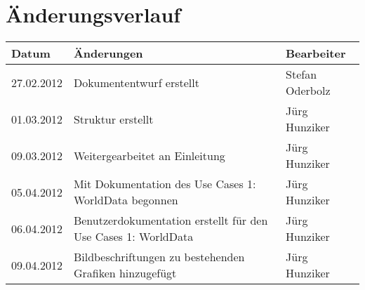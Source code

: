 \chapter*{Änderungsverlauf}

\begin{longtable}{|p{2cm}|p{10cm}|p{3cm}|}
\hline 
\textbf{Datum} & \textbf{Änderungen} & \textbf{Bearbeiter} \\ 
\hline 
27.02.2012 & Dokumententwurf erstellt & Stefan Oderbolz \\ 
\hline 
01.03.2012 & Struktur erstellt & Jürg Hunziker \\ 
\hline 
09.03.2012 & Weitergearbeitet an Einleitung & Jürg Hunziker \\ 
\hline 
05.04.2012 & Mit Dokumentation des Use Cases 1: WorldData begonnen & Jürg Hunziker \\ 
\hline 
06.04.2012 & Benutzerdokumentation erstellt für den Use Cases 1: WorldData & Jürg Hunziker \\ 
\hline 
09.04.2012 & Bildbeschriftungen zu bestehenden Grafiken hinzugefügt & Jürg Hunziker \\ 
\hline 
\end{longtable} 
